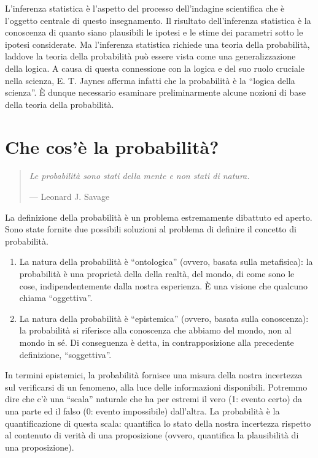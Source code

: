 \documentclass[
  10pt,
  italian,
  a4paper,
  extrafontsizes,onecolumn,openright
  ]{memoir}
\theoremstyle{definition}
\theoremstyle{definition}
\theoremstyle{definition}
\theoremstyle{definition}
\theoremstyle{remark}
\begin{document}
L'inferenza statistica è l'aspetto del processo dell'indagine scientifica che è l'oggetto centrale di questo insegnamento. Il risultato dell'inferenza statistica è la conoscenza di quanto siano plausibili le ipotesi e le stime dei parametri sotto le ipotesi considerate. Ma l'inferenza statistica richiede una teoria della probabilità, laddove la teoria della probabilità può essere vista come una generalizzazione della logica. A causa di questa connessione con la logica e del suo ruolo cruciale nella scienza, E. T. Jaynes afferma infatti che la probabilità è la ``logica della scienza''. È dunque necessario esaminare preliminarmente alcune nozioni di base della teoria della probabilità.

\hypertarget{che-cosuxe8-la-probabilituxe0}{%
\section{Che cos'è la probabilità?}\label{che-cosuxe8-la-probabilituxe0}}

\begin{quote}
\emph{Le probabilità sono stati della mente e non stati di natura.}

\begin{flushright}--- Leonard J. Savage \end{flushright}
\end{quote}

La definizione della probabilità è un problema estremamente dibattuto ed aperto. Sono state fornite due possibili soluzioni al problema di definire il concetto di probabilità.

\begin{enumerate}
\def\labelenumi{(\alph{enumi})}
\item
  La natura della probabilità è ``ontologica'' (ovvero, basata sulla metafisica): la probabilità è una proprietà della della realtà, del mondo, di come sono le cose, indipendentemente dalla nostra esperienza. È una visione che qualcuno chiama ``oggettiva''.
\item
  La natura della probabilità è ``epistemica'' (ovvero, basata sulla conoscenza): la probabilità si riferisce alla conoscenza che abbiamo del mondo, non al mondo in sé. Di conseguenza è detta, in contrapposizione alla precedente definizione, ``soggettiva''.
\end{enumerate}

In termini epistemici, la probabilità fornisce una misura della nostra incertezza sul verificarsi di un fenomeno, alla luce delle informazioni disponibili. Potremmo dire che c'è una ``scala'' naturale che ha per estremi il vero (1: evento certo) da una parte ed il falso (0: evento impossibile) dall'altra. La probabilità è la quantificazione di questa scala: quantifica lo stato della nostra incertezza rispetto al contenuto di verità di una proposizione (ovvero, quantifica la plausibilità di una proposizione).
\end{document}
